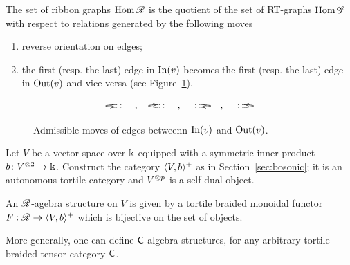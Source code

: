\begin{lemma}
  The set of ribbon graphs $\operatorname{Hom}\mathscr{R}$ is the quotient of the set of
  RT-graphs $\operatorname{Hom}\mathscr{G}_{}$ with respect to relations generated by the
  following moves
  \begin{enumerate}[(M1)]%
  \item \label{M3} reverse orientation on edges;
  \item \label{M4} the first (resp. the last) edge in $\operatorname{In}(v)$ becomes
    the first (resp. the last) edge in $\operatorname{Out}(v)$ and vice-versa (see
    Figure~\ref{fig:moving-edges-in-out}).
  \end{enumerate}
\end{lemma} 
\begin{figure}
  \begin{equation*}
    {%
      \xy*!LC\xybox{
        (0,1)*+[F]{\ };%
        (-1,0)**\dir{.},(-0.5,0)**\dir{-},%
        (0,0.5)*+{\ldots},(1,0)**\dir{-},%
        (-1,2)**\dir{-},(-0.5,2)**\dir{-},%
        (0,1.5)*+{\ldots},(1,2)**\dir{-},%
        \ar @/l1em/ (-.45,1.40);(-.45,0.50)
      }\endxy\quad,\quad\xy*!LC\xybox{
        (0,1)*+[F]{\ };%
        (-1,0)**\dir{-},(-0.5,0)**\dir{-},%
        (0,0.5)*+{\ldots},(1,0)**\dir{-},%
        (-1,2)**\dir{.},(-0.5,2)**\dir{-},%
        (0,1.5)*+{\ldots},(1,2)**\dir{-},%
        \ar @/l1em/ (-.45,0.40);(-.45,1.50)
      }\endxy\quad,\quad
      \xy*!LC\xybox{
        (0,1)*+[F]{\ };%
        (-1,0)**\dir{-},(0.5,0)**\dir{-},%
        (0,0.5)*+{\ldots},(1,0)**\dir{.},%
        (-1,2)**\dir{-},(0.5,2)**\dir{-},%
        (0,1.5)*+{\ldots},(1,2)**\dir{-},%
        \ar @/r1em/ (.45,1.40);(.45,0.50)
      }\endxy\quad,\quad\xy*!LC\xybox{
        (0,1)*+[F]{\ };%
        (-1,0)**\dir{-},(0.5,0)**\dir{-},%
        (0,0.5)*+{\ldots},(1,0)**\dir{-},%
        (-1,2)**\dir{-},(0.5,2)**\dir{-},%
        (0,1.5)*+{\ldots},(1,2)**\dir{.},%
        \ar @/r1em/ (.45,0.40);(.45,1.50)
      }\endxy
    }
  \end{equation*}
  \caption{Admissible moves of edges betweenn $\operatorname{In}(v)$ and $\operatorname{Out}(v)$.}
  \label{fig:moving-edges-in-out}
\end{figure}

Let $V$ be a vector space over $\Bbbk$ equipped with a symmetric inner
product $b\colon V\sp{\otimes 2} \to \Bbbk$. Construct the category $\langle V,b\rangle^+$ as
in Section~\ref{sec:bosonic}; it is an autonomous tortile category and
$V\sp{\otimes p}$ is a self-dual object.
\begin{definition}
  \label{dfn:rg-algebra}
  An $\mathscr{R}$-agebra structure on $V$ is given by a tortile braided
  monoidal functor $F:\mathscr{R} \to \langle V,b\rangle^+$ which is bijective on the set
  of objects.
\end{definition}
More generally, one can define $\mathsf{C}$-algebra structures, for
any arbitrary tortile braided tensor category $\mathsf{C}$.

